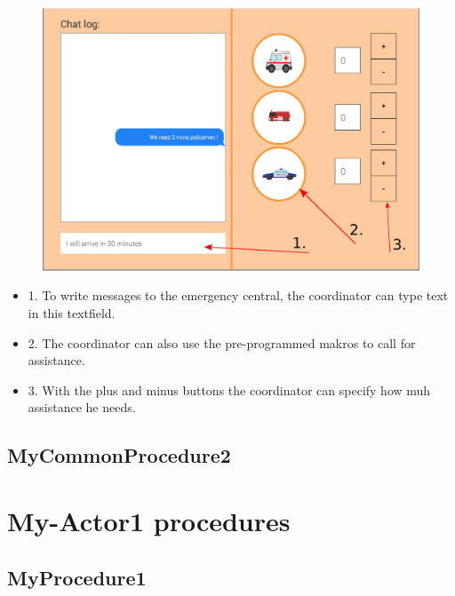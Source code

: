 \begin{minipage}{0.72\textwidth}
\begin{figure}[H]
\includegraphics[width=1.0\textwidth]{Ipad_Messages.eps}
\end{figure}
\end{minipage} \hfill
\begin{minipage}{0.23\textwidth}
\begin{itemize}
\item 1. To write messages to the emergency central, the coordinator can type
text in this textfield.
\item 2. The coordinator can also use the pre-programmed makros to call for
assistance.
\item 3. With the plus and minus buttons the coordinator can specify how muh
assistance he needs.
\end{itemize}
\end{minipage}






\subsection{MyCommonProcedure2}


\section{My-Actor1 procedures}

\subsection{MyProcedure1}


